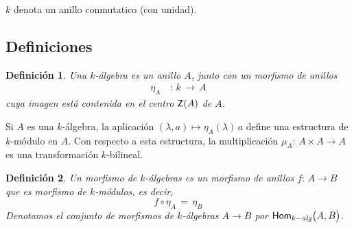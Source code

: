 \theoremstyle{plain}
\newtheorem{defAlgebra}{Definici\'{o}n}[section]
\newtheorem{propoLibre}[defAlgebra]{Proposici\'{o}n}
\newtheorem{propoRectaAfin}[defAlgebra]{Proposici\'{o}n}
\newtheorem{coroRectaAfin}[defAlgebra]{Corolario}
\newtheorem{propoMultiplicativo}[defAlgebra]{Proposici\'{o}n}
\newtheorem{coroMultiplicativo}[defAlgebra]{Corolario}
\newtheorem{propoProductoDeMatrices}[defAlgebra]{Proposici\'{o}n}
\newtheorem{propoLinealGeneral}[defAlgebra]{Proposici\'{o}n}
\newtheorem{propoProductoTensorialDeModulos}[defAlgebra]{Proposici\'{o}n}
\newtheorem{propoProductoTensorialDeAlgebras}[defAlgebra]{Proposici\'{o}n}
\newtheorem{propoProductoDeCociente}[defAlgebra]{Proposici\'{o}n}

\theoremstyle{definition}
\newtheorem{ejemploLibre}[defAlgebra]{Ejemplo}
\newtheorem{obsRectaAfin}[defAlgebra]{Observaci\'{o}n}
\newtheorem{obsProductoDeMatrices}[defAlgebra]{Observaci\'{o}n}
\newtheorem{ejemploProductoTensorialDeModulos}[defAlgebra]{Ejemplo}
\newtheorem{obsProductoTensorialDeModulos}[defAlgebra]{Observaci\'{o}n}
\newtheorem{obsAlgebra}[defAlgebra]{Observaci\'{o}n}
\newtheorem{obsProductoTensorialDeAlgebras}[defAlgebra]{Observaci\'{o}n}
\newtheorem{obsAlgebraEjemplos}[defAlgebra]{Observaci\'{o}n}


$k$ denota un anillo conmutatico (con unidad).

\subsection{Definiciones}\label{subsec:kalgebras:definiciones}

\begin{defAlgebra}\label{def:algebra}
	Una $k$-\'{a}lgebra es un anillo $A$, junto con un morfismo de anillos
	\begin{align*}
		\eta_A & \,:\,k\,\rightarrow\,A
	\end{align*}
	cuya imagen est\'{a} contenida en el centro
	$\mathsf{Z}(A)$ de $A$.
\end{defAlgebra}

Si $A$ es una $k$-\'{a}lgebra, la aplicaci\'{o}n
$(\lambda,a)\mapsto\eta_A(\lambda)\,a$ define una estructura de $k$-m\'{o}dulo
en $A$. Con respecto a esta estructura, la multiplicaci\'{o}n
$\mu_A:\,A\times A\rightarrow A$ es una transformaci\'{o}n $k$-bilineal.

\begin{defAlgebra}\label{def:morfismodealgebras}
	Un morfismo de $k$-\'{a}lgebras es un morfismo de anillos
	$f:\,A\rightarrow B$ que es morfismo de $k$-m\'{o}dulos, es decir,
	\begin{equation}
		\label{eq:morfismodealgebras}
		f\circ\eta_A \,=\,\eta_B
	\end{equation}
	Denotamos el conjunto de morfismos de $k$-\'{a}lgebras $A\rightarrow B$
	por $\mathsf{Hom}_{k-\mathit{alg}}\big(A,B\big)$.
\end{defAlgebra}

